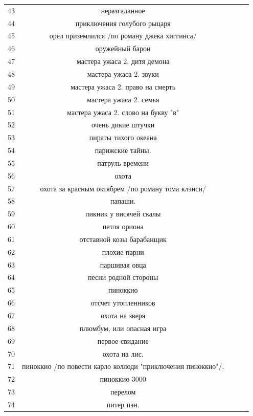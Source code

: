 \documentclass[12pt]{report}
\begin{document}
\begin{table}[H]
	\label{tab:v6}
	\begin{center}

		\begin{tabular}{|c@{\hspace{7mm}}|c@{\hspace{7mm}}|c@{\hspace{7mm}}|c|c|}
		\hline
43 & неразгаданное \\
44 & приключения голубого рыцаря \\
45 & орел приземлился /по роману джека хиггинса/ \\
46 & оружейный барон \\
47 & мастера ужаса 2. дитя демона \\
48 & мастера ужаса 2. звуки \\
49 & мастера ужаса 2. право на смерть \\
50 & мастера ужаса 2. семья \\
51 & мастера ужаса 2. слово на букву "в" \\
52 & очень дикие штучки \\
53 & пираты тихого океана \\
54 & парижские тайны. \\
55 & патруль времени \\
56 & охота \\
57 & охота за красным октябрем /по роману тома клэнси/ \\
58 & папаши. \\
59 & пикник у висячей скалы \\
60 & петля ориона \\
61 & отставной козы барабанщик \\
62 & плохие парни \\
63 & паршивая овца \\
64 & песни родной стороны \\
65 & пиноккио \\
66 & отсчет утопленников \\
67 & охота на зверя \\
68 & плюмбум, или опасная игра \\
69 & первое свидание \\
70 & охота на лис. \\
71 & пиноккио /по повести карло коллоди "приключения пиноккио"/. \\
72 & пиноккио 3000 \\
73 & перелом \\
74 & питер пэн. \\

\end{tabular}
\end{center}
\end{table}
\end{document}
